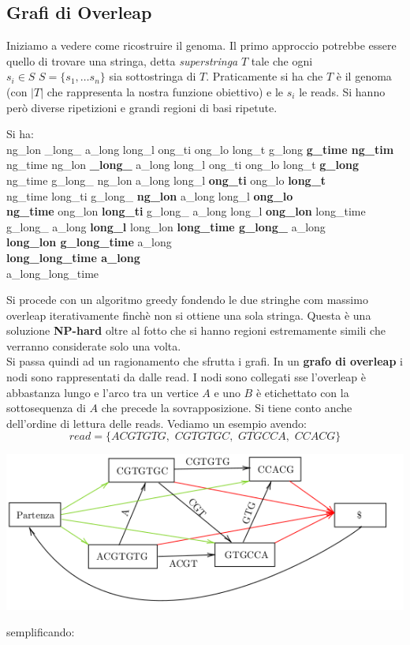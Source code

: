 \documentclass[a4paper,12pt, oneside]{book}
\begin{document}
\subsection{Grafi di Overleap}
Iniziamo a vedere come ricostruire il genoma. Il primo approccio
potrebbe essere quello di trovare una stringa, detta
\textit{superstringa} $T$ tale che ogni
$s_i \in S\,\,S=\{s_1,\ldots s_n\}$ sia sottostringa di
$T$. Praticamente si ha che $T$ è il genoma (con $|T|$ che rappresenta
la nostra funzione obiettivo) e le $s_i$ le reads. Si
hanno però diverse ripetizioni e grandi regioni di basi ripetute.
\begin{esempio}
  Si ha:\\
  ng\_lon \_long\_ a\_long long\_l ong\_ti ong\_lo long\_t g\_long
  \textbf{g\_time ng\_tim}\\
  ng\_time ng\_lon \textbf{\_long\_} a\_long long\_l ong\_ti ong\_lo long\_t
  \textbf{g\_long}\\  
  ng\_time g\_long\_ ng\_lon a\_long long\_l \textbf{ong\_ti} ong\_lo
  \textbf{long\_t}\\ 
  ng\_time long\_ti g\_long\_ \textbf{ng\_lon} a\_long long\_l
  \textbf{ong\_lo}\\
  \textbf{ng\_time} ong\_lon \textbf{long\_ti} g\_long\_ a\_long long\_l
  \textbf{ong\_lon} long\_time g\_long\_ a\_long \textbf{long\_l}
  long\_lon \textbf{long\_time g\_long\_} a\_long\\
  \textbf{long\_lon g\_long\_time} a\_long\\
  \textbf{long\_long\_time a\_long}\\
  a\_long\_long\_time
\end{esempio}
Si procede con un algoritmo greedy fondendo le due stringhe com massimo
overleap iterativamente finchè non si ottiene una sola stringa. Questa
è una soluzione \textbf{NP-hard} oltre al fotto che si hanno regioni
estremamente simili che verranno considerate solo una volta.
\\
Si passa quindi ad un ragionamento che sfrutta i grafi. In un
\textbf{grafo di overleap} i nodi sono rappresentati da dalle read. I
nodi sono collegati sse l'overleap è abbastanza lungo e l'arco tra un
vertice $A$ e uno $B$ è etichettato con la sottosequenza di $A$ che
precede la sovrapposizione. Si tiene conto anche dell'ordine di
lettura delle reads.
Vediamo un esempio avendo:
\[read=\{ACGTGTG,\,\, CGTGTGC,\,\, GTGCCA,\,\, CCACG\}\]
\begin{center}
  \includegraphics[scale = 0.6]{img/gra.png}
\end{center}
\newpage
semplificando:
\end{document}
